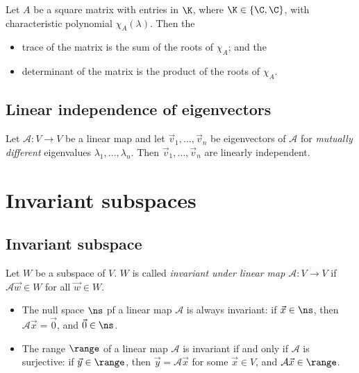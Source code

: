 \begin{theorem}
    Let $A$ be a square matrix with entries in $\K$, where $\K \in \{\C, \C\}$, with characteristic polynomial $\chi_A(\lambda)$. Then the
    \begin{itemize}
        \item trace of the matrix is the sum of the roots of $\chi_A$; and the
        \item determinant of the matrix is the product of the roots of $\chi_A$.
    \end{itemize}
\end{theorem}

\subsection{Linear independence of eigenvectors}
\begin{theorem}
    Let $\mathcal{A}: V \to V$ be a linear map and let $\vec{v}_1, \dots, \vec{v}_n$ be eigenvectors of $\mathcal{A}$ for \emph{mutually different} eigenvalues
    $\lambda_1, \dots, \lambda_n$. Then $\vec{v}_1, \dots, \vec{v}_n$ are linearly independent.
\end{theorem}

\section{Invariant subspaces}
\subsection{Invariant subspace}
\begin{definition}
    Let $W$ be a subspace of $V$. $W$ is called \emph{invariant under linear map $\mathcal{A}: V \to V$} if $\mathcal{A}\vec{w} \in W$ for all $\vec{w} \in W$.
\end{definition}

\begin{example}
    \begin{itemize}
        \item The null space $\ns$ pf a linear map $\mathcal{A}$ is always invariant: if $\vec{x} \in \ns$, then $\mathcal{A}\vec{x} = \vec{0}$,
            and $\vec{0} \in \ns$.
        \item The range $\range$ of a linear map $\mathcal{A}$ is invariant if and only if $\mathcal{A}$ is surjective: if $\vec{y} \in \range$,
            then $\vec{y} = \mathcal{A}\vec{x}$ for some $\vec{x} \in V$, and $\mathcal{A}\vec{x} \in \range$.
    \end{itemize}
\end{example}

